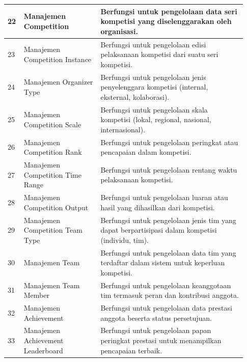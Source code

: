 \begin{longtable}{|p{0.05\linewidth}|p{0.30\linewidth}|p{0.58\linewidth}|}
      \hline
      22          & Manajemen Competition                  & Berfungsi untuk pengelolaan data seri kompetisi yang diselenggarakan oleh organisasi.                 \\
      \hline
      23          & Manajemen Competition Instance         & Berfungsi untuk pengelolaan edisi pelaksanaan kompetisi dari suatu seri kompetisi.                    \\
      \hline
      24          & Manajemen Organizer Type               & Berfungsi untuk pengelolaan jenis penyelenggara kompetisi (internal, eksternal, kolaborasi).          \\
      \hline
      25          & Manajemen Competition Scale            & Berfungsi untuk pengelolaan skala kompetisi (lokal, regional, nasional, internasional).               \\
      \hline
      26          & Manajemen Competition Rank             & Berfungsi untuk pengelolaan peringkat atau pencapaian dalam kompetisi.                                \\
      \hline
      27          & Manajemen Competition Time Range       & Berfungsi untuk pengelolaan rentang waktu pelaksanaan kompetisi.                                      \\
      \hline
      28          & Manajemen Competition Output           & Berfungsi untuk pengelolaan luaran atau hasil yang dihasilkan dari kompetisi.                         \\
      \hline
      29          & Manajemen Competition Team Type        & Berfungsi untuk pengelolaan jenis tim yang dapat berpartisipasi dalam kompetisi (individu, tim).      \\
      \hline
      30          & Manajemen Team                         & Berfungsi untuk pengelolaan data tim yang terdaftar dalam sistem untuk keperluan kompetisi.           \\
      \hline
      31          & Manajemen Team Member                  & Berfungsi untuk pengelolaan keanggotaan tim termasuk peran dan kontribusi anggota.                    \\
      \hline
      32          & Manajemen Achievement                  & Berfungsi untuk pengelolaan data prestasi anggota beserta status persetujuan.                         \\
      \hline
      33          & Manajemen Achievement Leaderboard      & Berfungsi untuk pengelolaan papan peringkat prestasi untuk menampilkan pencapaian terbaik.            \\

\end{longtable}
